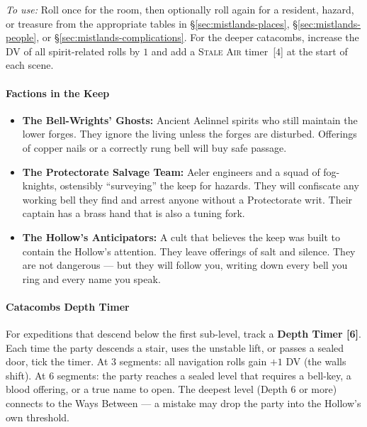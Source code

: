 \begin{tcolorbox}[
  enhanced,
  breakable,
  colback=black!3,
  colframe=blue!60!black,
  title={Generator --- Black Barrow Keep: Rooms \& Encounters},
  left=2mm,right=2mm,top=2mm,bottom=2mm
]
\bigskip
\textit{To use:} Roll once for the room, then optionally roll again for
a resident, hazard, or treasure from the appropriate tables in
\S\ref{sec:mistlands-places}, \S\ref{sec:mistlands-people}, or
\S\ref{sec:mistlands-complications}. For the deeper catacombs, increase
the DV of all spirit-related rolls by $1$ and add a \textsc{Stale Air}
timer~[$4$] at the start of each scene.
\end{tcolorbox}

\paragraph*{Factions in the Keep}
\begin{itemize}
\item \textbf{The Bell-Wrights' Ghosts:} Ancient Aelinnel spirits who still maintain the lower forges. They ignore the living unless the forges are disturbed. Offerings of copper nails or a correctly rung bell will buy safe passage.
\item \textbf{The Protectorate Salvage Team:} Aeler engineers and a squad of fog-knights, ostensibly ``surveying'' the keep for hazards. They will confiscate any working bell they find and arrest anyone without a Protectorate writ. Their captain has a brass hand that is also a tuning fork.
\item \textbf{The Hollow's Anticipators:} A cult that believes the keep was built to contain the Hollow's attention. They leave offerings of salt and silence. They are not dangerous --- but they will follow you, writing down every bell you ring and every name you speak.
\end{itemize}

\paragraph*{Catacombs Depth Timer }
For expeditions that descend below the first sub-level, track a \textbf{Depth Timer [6]}. Each time the party descends a stair, uses the unstable lift, or passes a sealed door, tick the timer. At 3 segments: all navigation rolls gain $+1$ DV (the walls shift). At 6 segments: the party reaches a sealed level that requires a bell-key, a blood offering, or a true name to open. The deepest level (Depth 6 or more) connects to the Ways Between --- a mistake may drop the party into the Hollow's own threshold.